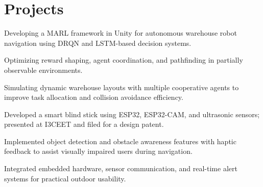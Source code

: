 \documentclass[]{plushcv}
\begin{document}
\begin{minipage}[t]{0.80\textwidth}

\section{Projects}

\begin{tightemize}
\item Developing a MARL framework in Unity for autonomous warehouse robot navigation using DRQN and LSTM-based decision systems.
\item Optimizing reward shaping, agent coordination, and pathfinding in partially observable environments.
\item Simulating dynamic warehouse layouts with multiple cooperative agents to improve task allocation and collision avoidance efficiency.
\end{tightemize}
\sectionsep

\begin{tightemize}
\item Developed a smart blind stick using ESP32, ESP32-CAM, and ultrasonic sensors; presented at I3CEET and filed for a design patent.
\item Implemented object detection and obstacle awareness features with haptic feedback to assist visually impaired users during navigation.
\item Integrated embedded hardware, sensor communication, and real-time alert systems for practical outdoor usability.
\end{tightemize}
\sectionsep


%
%

\end{minipage} 
\end{document}
